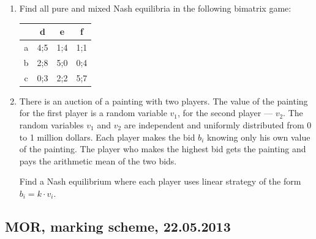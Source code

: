 \documentclass[12pt]{article} %
\theoremstyle{definition} %
\begin{document}
\begin{enumerate}[resume]
\item Find all pure and mixed Nash equilibria in the following bimatrix game:


\begin{tabular}{c|ccc}
 & d & e & f \\
\hline
a & 4;5 & 1;4 & 1;1  \\
b & 2;8 & 5;0 & 0;4  \\
c & 0;3 & 2;2 & 5;7  \\
\end{tabular}


\item There is an auction of a painting with two players. The value of the painting for the first player is a random variable $v_1$, for the second player --- $v_2$. The random variables $v_1$ and $v_2$ are independent and uniformly distributed from 0 to 1 million dollars. Each player makes the bid $b_i$ knowing only his own value of the painting. The player who makes the highest bid gets the painting and pays the arithmetic mean of the two bids.

Find a Nash equilibrium where each player uses linear strategy of the form $b_i=k\cdot v_i$.

\end{enumerate}

\subsection{MOR, marking scheme, 22.05.2013 }
\end{document}
